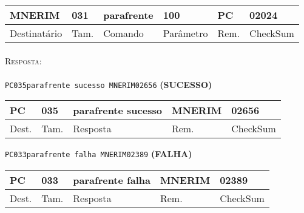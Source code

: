 \documentclass[11pt,	 papera4]{article}
\begin{document}
\begin{table}[h]
	\centering
	\begin{tabular}{p{2cm}p{1cm}p{2cm}p{2cm}p{1cm}p{2cm}}
		\toprule
		MNERIM & 031 & parafrente & 100 & PC & 02024 \\
		\midrule	
		Destinatário & Tam. & Comando & Parâmetro & Rem. & CheckSum \\
		\bottomrule
	\end{tabular}
	\label{tab:formatoslatex} %
\end{table}

\paragraph*{\newline\newline}
\hspace*{0.8cm}\textsc{Resposta:} \\\\ \hspace*{2cm}\texttt{PC035parafrente sucesso MNERIM02656} \hspace*{2cm}\textbf{(SUCESSO)}

\begin{table}[h]
	\centering
	\begin{tabular}{p{1cm}p{1cm}p{3.2cm}p{2cm}p{2cm}}
		\toprule
		PC & 035 &parafrente sucesso  & MNERIM & 02656 \\
		\midrule	
		Dest. & Tam. & Resposta & Rem. & CheckSum \\
		\bottomrule
	\end{tabular}
	\label{tab:formatoslatex} %
\end{table}

\hspace*{1.2cm} \texttt{PC033parafrente falha MNERIM02389} \hspace*{2.5cm}\textbf{(FALHA)}

\begin{table}[h]
	\centering
	\begin{tabular}{p{1cm}p{1cm}p{3cm}p{2cm}p{2cm}}
		\toprule
		PC & 033 & parafrente falha  & MNERIM & 02389 \\
		\midrule	
		Dest. & Tam. & Resposta & Rem. & CheckSum \\
		\bottomrule
	\end{tabular}
	\label{tab:formatoslatex} %
\end{table}

\newpage
\end{document}
